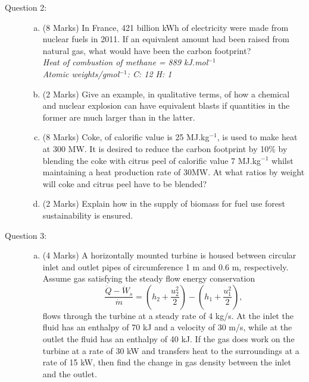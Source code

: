 \documentclass[12pt,twoside]{report}
\newcommand{\frc}{\displaystyle\frac}
\begin{document}
\begin{description}
\begin{enumerate}[(a)]
\end{enumerate}

\item [Question 2:] \mbox{}
\begin{enumerate}[(a)]
\item (8 Marks) In France, 421 billion kWh of electricity were made from nuclear fuels in 2011.  If an equivalent amount had been raised from natural gas, what would have been the carbon footprint? \\
{\it Heat of combustion of methane = 889 kJ.mol$^{-1}$ \\
Atomic weights/gmol$^{-1}$: C: 12 \;\; H: 1}
\item (2 Marks) Give an example, in qualitative terms, of how a chemical and nuclear explosion can have equivalent blasts if quantities in the former are much larger than in the latter.
\item (8 Marks) Coke, of calorific value is 25 MJ.kg$^{-1}$, is used to make heat at 300 MW. It is desired to reduce the carbon footprint by 10$\%$ by blending the coke with citrus peel of calorific value 7 MJ.kg$^{-1}$ whilst maintaining a heat production rate of 30MW. At what ratios by weight will coke and citrus peel have to be blended?
\item (2 Marks) Explain how in the supply of biomass for fuel use forest sustainability is ensured. 
\end{enumerate} 


\item [Question 3:] \mbox{}

\begin{enumerate}[(a)]
%
\item (4 Marks) A horizontally mounted turbine is housed between circular inlet and outlet pipes of circumference 1 m and 0.6 m, respectively. Assume gas satisfying the steady flow energy conservation
\begin{displaymath}
\frc{ \dot{Q} -\dot{W}_{s}}{\dot{m}} = \left( h_{2}+ \frc{u_{2}^{2}}{2}\right) - \left(h_{1} + \frc{u_{1}^{2}}{2}\right),
\end{displaymath}
flows through the turbine at a steady rate of 4 kg/s. At the inlet the fluid has an enthalpy of 70 kJ and a velocity of 30 m/s, while at the outlet the fluid has an enthalpy of 40 kJ. If the gas does work on the turbine at a rate of 30 kW and transfers heat to the surroundings at a rate of 15 kW, then find the change in gas density between the inlet and the outlet.


\end{enumerate}
\end{description}
\end{document}
